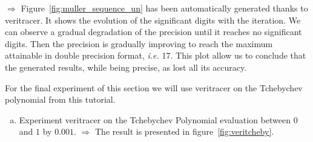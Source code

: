 $\Rightarrow$ Figure~\ref{fig:muller_sequence_un} has been automatically generated thanks to veritracer. It shows the evolution of the significant digits with the iteration. We can observe a gradual degradation of the precision until it reaches no significant digits. Then the precision is gradually improving to reach the maximum attainable in double precision format, {\it i.e.} 17. This plot allow us to conclude that the generated results, while being precise, as lost all its accuracy.

For the final experiment of this section we will use veritracer on the Tchebychev polynomial from this tutorial.

\begin{question}
  \begin{enumerate}[(a)]
      \item Experiment veritracer on the Tchebychev Polynomial evaluation between $0$ and $1$ by $0.001$.
      $\Rightarrow$ The result is presented in figure~\ref{fig:veritcheby}.



%


  \end{enumerate}
\end{question}

